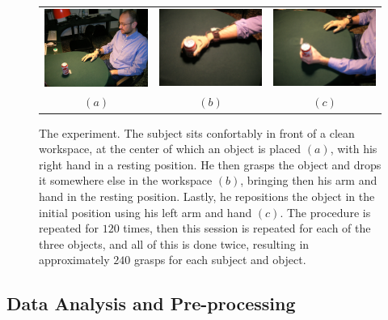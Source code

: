 \begin{figure}[htbp]
  \begin{center}
    \begin{tabular}{ccc}
      \includegraphics[width=0.3\linewidth]{exp1.eps} &
      \includegraphics[width=0.3\linewidth]{exp2.eps}  &
      \includegraphics[width=0.3\linewidth]{exp3.eps} \\
      $(a)$ & $(b)$ & $(c)$
    \end{tabular}
    \caption{The experiment. The subject sits confortably in
    front of a clean workspace, at the center of which an object is
    placed $(a)$, with his right hand in a resting position. He then
    grasps the object and drops it somewhere else in the workspace
    $(b)$, bringing then his arm and hand in the resting
    position. Lastly, he repositions the object in the initial
    position using his left arm and hand $(c)$. The procedure is repeated
    for $120$ times, then this session is repeated for each of the
    three objects, and all of this is done twice, resulting in
    approximately $240$ grasps for each subject and object.}
    \label{fig:setup}
  \end{center}
\end{figure}

\subsection*{Data Analysis and Pre-processing}
